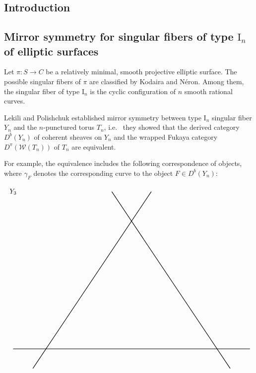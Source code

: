 \documentclass[a0,landscape]{a0poster}
\theoremstyle{plain}
\theoremstyle{definition}
\begin{document}
\large
\begin{multicols}{3} %






    \color{NavyBlue}\section{Introduction}

    \color{DarkSlateGray} %
    \subsection{Mirror symmetry for singular fibers of type $\textrm{I}_n$ of elliptic surfaces}
    Let $\pi \colon S \to C$ be a relatively minimal, smooth projective elliptic surface.
    The possible singular fibers of $\pi$ are classified by Kodaira and N\'{e}ron.
    Among them, the singular fiber of type $\textrm{I}_n$ is the cyclic configuration of $n$ smooth rational curves.

    Lekili and Polishchuk \cite{MR3663596} established mirror symmetry between type $\textrm{I}_n$ singular fiber $Y_n$ and the $n$-punctured torus $T_n$, i.e.~ they showed that the derived category $D^b(Y_n)$ of coherent sheaves on $Y_n$ and the wrapped Fukaya category $D^\pi(\mathcal{W}(T_n))$ of $T_n$ are equivalent.

    For example, the equivalence includes the following correspondence of objects, where $\gamma_F$ denotes the corresponding curve to the object $F \in D^b(Y_n)$:
    \begin{center}
        \centering
        \begin{displaymath}
            \begin{tikzpicture}
                \draw(-10, 8) node{$Y_3$};
                \draw[thick] (-9,-1)--(-3,8);
                \draw[thick] (-10,0)--(2,0);
                \draw[thick] (1,-1)--(-5,8);


\end{tikzpicture}
\end{displaymath}
\end{center}
\end{multicols}
\end{document}
